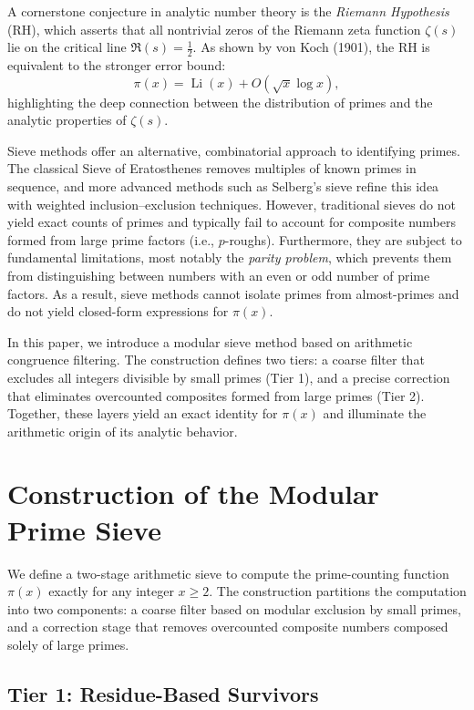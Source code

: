 \documentclass[11pt]{article}
\begin{document}
	A cornerstone conjecture in analytic number theory is the \textit{Riemann Hypothesis} (RH), which asserts that all nontrivial zeros of the Riemann zeta function \( \zeta(s) \) lie on the critical line \( \Re(s) = \frac{1}{2} \). As shown by von Koch (1901), the RH is equivalent to the stronger error bound:
	\[
	\pi(x) = \operatorname{Li}(x) + O\left(\sqrt{x} \log x\right),
	\]
	highlighting the deep connection between the distribution of primes and the analytic properties of \( \zeta(s) \).
	
	Sieve methods offer an alternative, combinatorial approach to identifying primes. The classical Sieve of Eratosthenes removes multiples of known primes in sequence, and more advanced methods such as Selberg’s sieve refine this idea with weighted inclusion--exclusion techniques. However, traditional sieves do not yield exact counts of primes and typically fail to account for composite numbers formed from large prime factors (i.e., \( p \)-roughs). Furthermore, they are subject to fundamental limitations, most notably the \emph{parity problem}, which prevents them from distinguishing between numbers with an even or odd number of prime factors. As a result, sieve methods cannot isolate primes from almost-primes and do not yield closed-form expressions for \( \pi(x) \).
	
	In this paper, we introduce a modular sieve method based on arithmetic congruence filtering. The construction defines two tiers: a coarse filter that excludes all integers divisible by small primes (Tier 1), and a precise correction that eliminates overcounted composites formed from large primes (Tier 2). Together, these layers yield an exact identity for \( \pi(x) \) and illuminate the arithmetic origin of its analytic behavior.


	
	
	\section{Construction of the Modular Prime Sieve}
	
	We define a two-stage arithmetic sieve to compute the prime-counting function \( \pi(x) \) exactly for any integer \( x \geq 2 \). The construction partitions the computation into two components: a coarse filter based on modular exclusion by small primes, and a correction stage that removes overcounted composite numbers composed solely of large primes.
	
	\subsection{Tier 1: Residue-Based Survivors}
	
\end{document}
